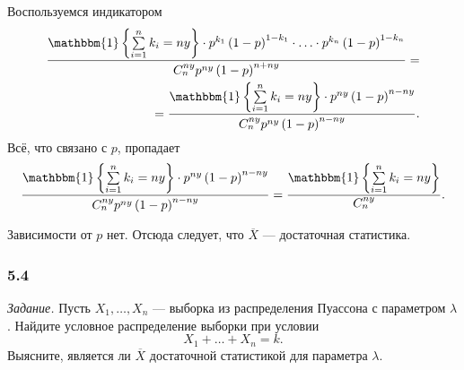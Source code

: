 Воспользуемся индикатором
\begin{equation*}
  \begin{split}
    \frac{ \mathbbm{1} \left\{ \sum \limits_{i = 1}^n k_i = ny \right\} \cdot p^{k_1} \left( 1 - p \right)^{1 - k_1} \cdot \dotsc \cdot p^{k_n} \left( 1 - p \right)^{1 - k_n}}{C_n^{ny} p^{ny} \left( 1 - p \right)^{n + ny}} = \\
    = \frac{ \mathbbm{1} \left\{ \sum \limits_{i = 1}^n k_i = ny \right\} \cdot p^{ny} \left( 1 - p \right)^{n - ny}}{C_n^{ny} p^{ny} \left( 1 - p \right)^{n - ny}}.
  \end{split}
\end{equation*}
Всё, что связано с $p$, пропадает
$$ \frac{ \mathbbm{1} \left\{ \sum \limits_{i = 1}^n k_i = ny \right\} \cdot p^{ny} \left( 1 - p \right)^{n - ny}}{C_n^{ny} p^{ny} \left( 1 - p \right)^{n - ny}} =
  \frac{ \mathbbm{1} \left\{ \sum \limits_{i = 1}^n k_i = ny \right\} }{C_n^{ny}}.$$

Зависимости от $p$ нет.
Отсюда следует, что $ \overline{X}$ --- достаточная статистика.

\subsubsection{5.4}

\textit{Задание.}
Пусть $X_1, \dotsc, X_n$ --- выборка из распределения Пуассона с параметром $ \lambda $.
Найдите условное распределение выборки при условии
$$X_1 + \dotsc + X_n = k.$$
Выясните, является ли $ \overline{X}$ достаточной статистикой для параметра $ \lambda $.

